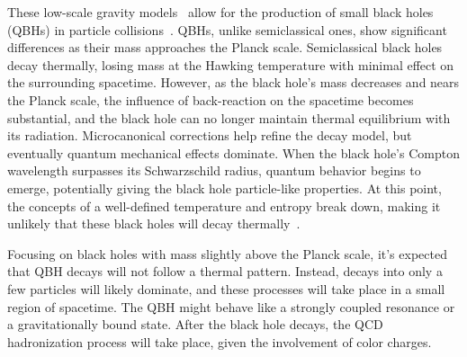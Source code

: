 These low-scale gravity models~\cite{Antoniadis_Arkani_Dimopoulos_Dvali-1998,ADD-1998,RS1-1999_1,RS1-1999_2,Dvali-2008,Dvali-2010} allow for the production of small black holes (\acp{QBH}) in particle collisions~\cite{Argyres-1998,Banks-1999,Giddings-2002}.
\acp{QBH}, unlike semiclassical ones, show significant differences as their mass approaches the Planck scale. Semiclassical black holes decay thermally, losing mass at the Hawking temperature with minimal effect on the surrounding spacetime. However, as the black hole's mass decreases and nears the Planck scale, the influence of back-reaction on the spacetime becomes substantial, and the black hole can no longer maintain thermal equilibrium with its radiation. Microcanonical corrections help refine the decay model, but eventually quantum mechanical effects dominate. When the black hole's Compton wavelength surpasses its Schwarzschild radius, quantum behavior begins to emerge, potentially giving the black hole particle-like properties. At this point, the concepts of a well-defined temperature and entropy break down, making it unlikely that these black holes will decay thermally~\cite{Meade-2008,Alberghi-2006,Alberghi-2007}.

Focusing on black holes with mass slightly above the Planck scale, it's expected that \ac{QBH} decays will not follow a thermal pattern. Instead, decays into only a few particles will likely dominate, and these processes will take place in a small region of spacetime. The \ac{QBH} might behave like a strongly coupled resonance or a gravitationally bound state. After the black hole decays, the \ac{QCD} hadronization process will take place, given the involvement of color charges.


